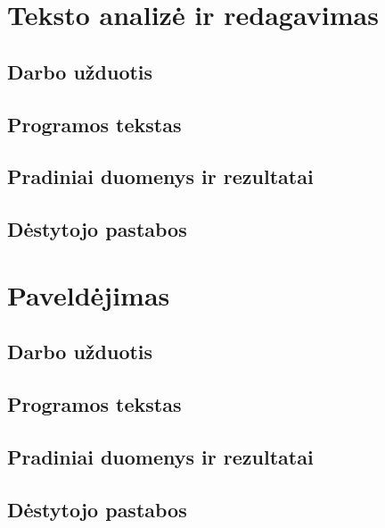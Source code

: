 \documentclass{article}
\begin{document}

\section{Teksto analizė ir redagavimas}
\subsection{Darbo užduotis}
\subsection{Programos tekstas}
\subsection{Pradiniai duomenys ir rezultatai}
\subsection{Dėstytojo pastabos}
\newpage


\section{Paveldėjimas}
\subsection{Darbo užduotis}
\subsection{Programos tekstas}
\subsection{Pradiniai duomenys ir rezultatai}
\subsection{Dėstytojo pastabos}
\newpage
\end{document}
